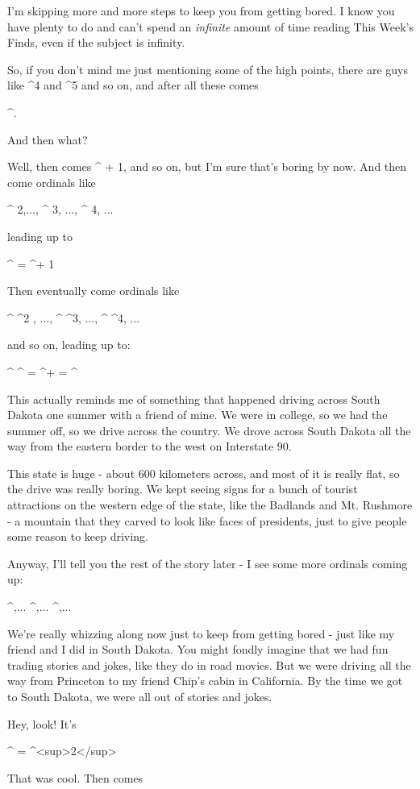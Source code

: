 I'm skipping more and more steps to keep you from getting bored. 
I know you have plenty to do and can't spend an \emph{infinite} amount 
of time reading This Week's Finds, even if the subject is infinity.  

So, if you don't mind me just mentioning some of the high points,
there are guys like \omega ^{4} and \omega ^{5} and so
on, and after all these comes

\omega ^{\omega }.

And then what?

Well, then comes \omega ^{\omega } + 1, and so on, but I'm sure
that's boring by now.  And then come ordinals like 

\omega ^{\omega } 2,..., \omega ^{\omega } 3, ..., \omega ^{\omega } 4, ...

leading up to 

\omega ^{\omega } \omega  = \omega ^{\omega  + 1}

Then eventually come ordinals like

\omega ^{\omega } \omega ^{2} , ..., \omega ^{\omega } \omega ^{3}, ..., \omega ^{\omega } \omega ^{4}, ...

and so on, leading up to:

\omega ^{\omega } \omega ^{\omega } = \omega ^{\omega  + \omega } = \omega ^{}

This actually reminds me of something that happened driving across 
South Dakota one summer with a friend of mine.  We were in college,
so we had the summer off, so we drive across the country.  We drove
across South Dakota all the way from the eastern border to the west
on Interstate 90.  

This state is huge - about 600 kilometers across, and most of it is 
really flat, so the drive was really boring.  We kept seeing signs 
for a bunch of tourist attractions on the western edge of the state, 
like the Badlands and Mt. Rushmore - a mountain that they carved 
to look like faces of presidents, just to give people some reason to keep
driving.  

Anyway, I'll tell you the rest of the story later - I see some more 
ordinals coming up:

\omega ^{},... \omega ^{},... \omega ^{},...

We're really whizzing along now just to keep from getting bored - just
like my friend and I did in South Dakota.  You might fondly imagine
that we had fun trading stories and jokes, like they do in road
movies.  But we were driving all the way from Princeton to my friend
Chip's cabin in California.  By the time we got to South Dakota, we
were all out of stories and jokes.

Hey, look!  It's

\omega ^{\omega  \omega } = \omega ^{\omega <sup>2}</sup>

That was cool.  Then comes 



